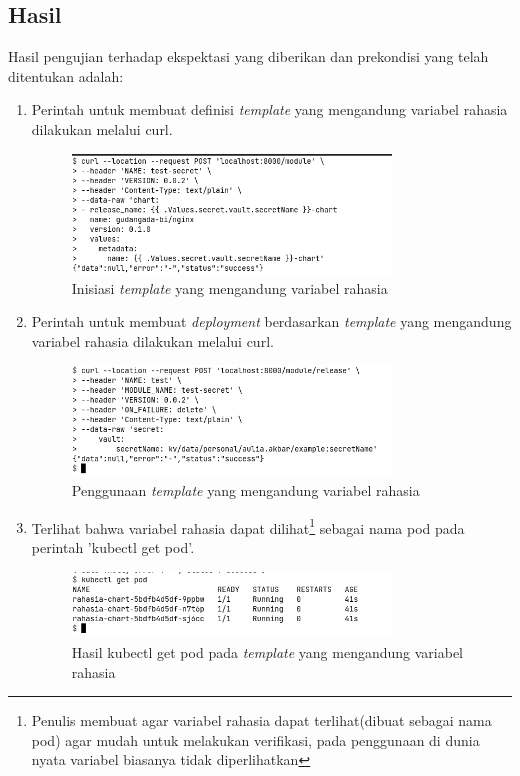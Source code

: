 \subsection{Hasil}
Hasil pengujian terhadap ekspektasi yang diberikan dan prekondisi yang telah ditentukan adalah:
\begin{enumerate}
    \item Perintah untuk membuat definisi \textit{template} yang mengandung variabel rahasia dilakukan melalui curl.
    \begin{figure}
    	\centering
    	\includegraphics[width=0.8\textwidth]{pics/5.5.initTemplate.png}
    	\caption{Inisiasi \textit{template} yang mengandung variabel rahasia}
    	\label{fig:initTemplateSecret}
    \end{figure}
    \item Perintah untuk membuat \textit{deployment} berdasarkan \textit{template} yang mengandung variabel rahasia dilakukan melalui curl.
    \begin{figure}
    	\centering
    	\includegraphics[width=0.8\textwidth]{pics/5.5.useTemplate.png}
    	\caption{Penggunaan \textit{template} yang mengandung variabel rahasia}
    	\label{fig:useTemplateSecret}
    \end{figure}
    \item Terlihat bahwa variabel rahasia dapat
    dilihat\footnote{Penulis membuat agar variabel rahasia dapat terlihat(dibuat sebagai nama pod) agar mudah untuk melakukan verifikasi, pada penggunaan di dunia nyata variabel biasanya tidak diperlihatkan} sebagai nama pod pada perintah 'kubectl get pod'.
    \begin{figure}
    	\centering
    	\includegraphics[width=0.8\textwidth]{pics/5.5.getPod.png}
    	\caption{Hasil kubectl get pod pada \textit{template} yang mengandung variabel rahasia}
    	\label{fig:getPodSecret}
    \end{figure}
\end{enumerate}


